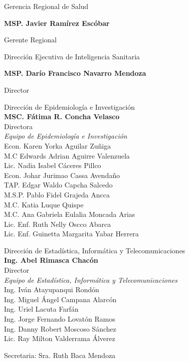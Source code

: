 \documentclass[12pt,a4paper,openany]{book}
\begin{document}
	
	\begin{center}
		{\large Gerencia Regional de Salud}
		
		\textbf{MSP. Javier Ramírez Escóbar}
		
		Gerente Regional \vspace{1.0cm}
		
		Dirección Ejecutiva de Inteligencia Sanitaria
		
		\textbf{MSP. Darío Francisco Navarro Mendoza}
		
		Director
		
		\vspace{1.5cm}
\noindent
\begin{minipage}[t]{.45\textwidth}
	\centering
	Dirección de Epidemiología e Investigación  \\
	\textbf{MSC. Fátima R. Concha Velasco}\\
	Directora \vspace{1.0cm}\\
	\textit{Equipo de Epidemiología e Investigación }\vspace{.5cm}\\
	Econ. Karen Yorka Aguilar Zuñiga \\
	M.C Edwards Adrian Aguirre Valenzuela \\
	Lic. Nadia Isabel Cáceres Pillco \\
	Econ. Johar Jurimao Cassa Avendaño \\
	TAP. Edgar Waldo Capcha Salcedo \\
	M.S.P. Pablo Fidel Grajeda Ancca \\
	M.C. Katia Luque Quispe \\
	M.C. Ana Gabriela Eulalia Moncada Arias \\
	Lic. Enf. Ruth Nelly Oscco Abarca \\
	Lic. Enf. Guinetta Margarita Yabar Herrera \vspace{1.5cm}\\	
\end{minipage}
\hfill
\noindent
\begin{minipage}[t]{.45\textwidth}
	\centering
	Dirección de Estadística, Informática y Telecomunicaciones\\
	\textbf{Ing. Abel Rimasca Chacón} \\
	Director \vspace{1.0cm} \\
	\textit{Equipo de Estadística, Informática y Telecomunicaciones} \vspace{.5cm} \\
	Ing. Iván Atayupanqui Rondón \\
	Ing. Miguel Ángel Campana Alarcón \\
	Ing. Uriel Lacuta Farfán \\
	Ing. Jorge Fernando Lovatón Ramos \\
	Ing. Danny Robert Moscoso Sánchez \\
	Lic. Ray Milton Valderrama Álverez \vspace{1.5cm}\\
\end{minipage}
Secretaria: Sra. Ruth Baca Mendoza
	\end{center}
\end{document}
